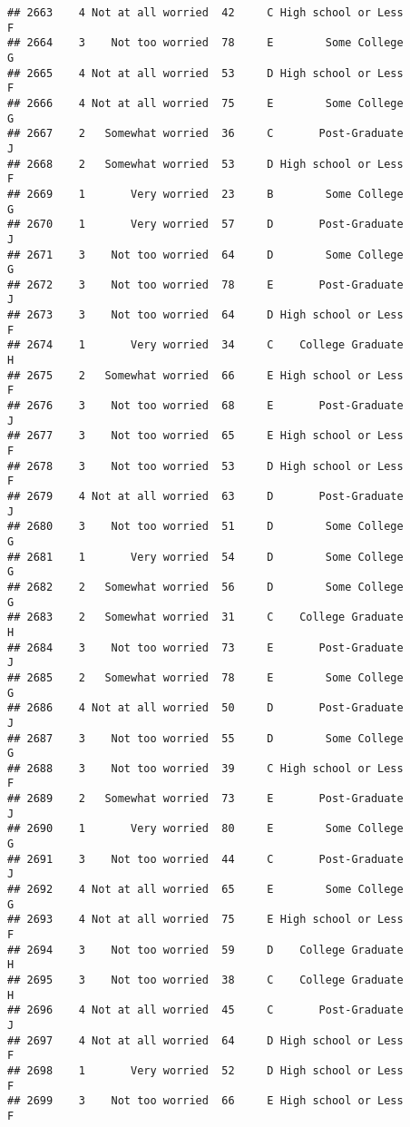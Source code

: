 \documentclass[
]{article}
\begin{document}
\begin{verbatim}
## 2663    4 Not at all worried  42     C High school or Less         F
## 2664    3    Not too worried  78     E        Some College         G
## 2665    4 Not at all worried  53     D High school or Less         F
## 2666    4 Not at all worried  75     E        Some College         G
## 2667    2   Somewhat worried  36     C       Post-Graduate         J
## 2668    2   Somewhat worried  53     D High school or Less         F
## 2669    1       Very worried  23     B        Some College         G
## 2670    1       Very worried  57     D       Post-Graduate         J
## 2671    3    Not too worried  64     D        Some College         G
## 2672    3    Not too worried  78     E       Post-Graduate         J
## 2673    3    Not too worried  64     D High school or Less         F
## 2674    1       Very worried  34     C    College Graduate         H
## 2675    2   Somewhat worried  66     E High school or Less         F
## 2676    3    Not too worried  68     E       Post-Graduate         J
## 2677    3    Not too worried  65     E High school or Less         F
## 2678    3    Not too worried  53     D High school or Less         F
## 2679    4 Not at all worried  63     D       Post-Graduate         J
## 2680    3    Not too worried  51     D        Some College         G
## 2681    1       Very worried  54     D        Some College         G
## 2682    2   Somewhat worried  56     D        Some College         G
## 2683    2   Somewhat worried  31     C    College Graduate         H
## 2684    3    Not too worried  73     E       Post-Graduate         J
## 2685    2   Somewhat worried  78     E        Some College         G
## 2686    4 Not at all worried  50     D       Post-Graduate         J
## 2687    3    Not too worried  55     D        Some College         G
## 2688    3    Not too worried  39     C High school or Less         F
## 2689    2   Somewhat worried  73     E       Post-Graduate         J
## 2690    1       Very worried  80     E        Some College         G
## 2691    3    Not too worried  44     C       Post-Graduate         J
## 2692    4 Not at all worried  65     E        Some College         G
## 2693    4 Not at all worried  75     E High school or Less         F
## 2694    3    Not too worried  59     D    College Graduate         H
## 2695    3    Not too worried  38     C    College Graduate         H
## 2696    4 Not at all worried  45     C       Post-Graduate         J
## 2697    4 Not at all worried  64     D High school or Less         F
## 2698    1       Very worried  52     D High school or Less         F
## 2699    3    Not too worried  66     E High school or Less         F

\end{verbatim}
\end{document}
